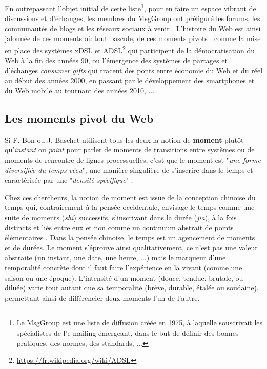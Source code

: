 \documentclass[symmetric,justified,marginals=raggedouter]{tufte-book}
\begin{document}
\noindent En outrepassant l'objet initial de cette liste\footnote{Le MsgGroup est une liste de diffusion créée en 1975, à laquelle souscrivait les spécialistes de l'e-mailing émergeant, dans le but de définir des bonnes pratiques, des normes, des standards, ...}, pour en faire un espace vibrant de discussions et d'échanges, les membres du MsgGroup ont préfiguré les forums, les communautés de blogs et les réseaux sociaux à venir \citep{stevenson_slashdot_2016,paloque-berges_quest-ce_2018}. L'histoire du Web est ainsi jalonnée de ces moments où tout bascule, de ces moments pivots : comme la mise en place des systèmes xDSL et ADSL\footnote{\url{https://fr.wikipedia.org/wiki/ADSL}} qui participent de la démocratisation du Web à la fin des années 90, ou l'émergence des systèmes de partages et d'échanges \textit{consumer gifts} \citep{giesler_consumer_2006} qui tracent des ponts entre économie du Web et du réel au début des années 2000, en passant par le développement des smartphones et du Web mobile au tournant des années 2010, ... 

\subsection{Les moments pivot du Web}

\noindent Si F. Bon ou J. Baschet utilisent tous les deux la notion de \textbf{moment} plutôt qu'\textit{instant} ou \textit{point} pour parler de moments de transitions entre systèmes ou de moments de rencontre de lignes processuelles, c'est que le moment est "\textit{une forme diversifiée du temps vécu}", une manière singulière de s'inscrire dans le temps et caractérisée par une "\textit{densité spécifique}" \citep[p.186]{baschet_defaire_2018}. 

Chez ces chercheurs, la notion de moment est issue de la conception chinoise du temps qui, contrairement à la pensée occidentale, envisage le temps comme une suite de moments (\textit{shí}) successifs, s'inscrivant dans la durée (\textit{jia}), à la fois distincts et liés entre eux \citep{chen_cerner_2011} et non comme un continuum abstrait de points élémentaires \citep[livre XI, chap. XV, 20, p.~195]{saint_augustin_confessions_1993}. Dans la pensée chinoise, le temps est un agencement de moments et de durées. Le moment s'éprouve ainsi qualitativement, ce n'est pas une valeur abstraite (un instant, une date, une heure, ...) mais le marqueur d'une temporalité concrète dont il faut faire l'expérience en la vivant (comme une saison ou une époque). L'intensité d'un moment (douce, tendue, brutale, ou diluée) varie tout autant que sa temporalité (brève, durable, étalée ou soudaine), permettant ainsi de différencier deux moments l'un de l'autre.
\end{document}
